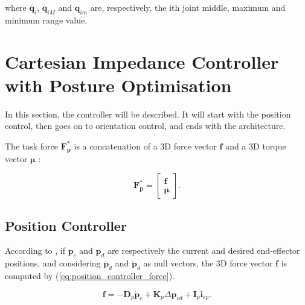 where $\boldsymbol{\bar{q}}_i$, $\boldsymbol{q}_{iM}$ and $\boldsymbol{q}_{im}$ are, respectively, the ith joint middle, maximum and minimum range value.


\section{Cartesian Impedance Controller with Posture Optimisation}
\label{sec:control_architectures_cartesian_impedance_posture_optimisation}

In this section, the controller will be described. It will start with the position control, then goes on to orientation control, and ends with the architecture.

The task force $\boldsymbol{F^*_p}$ is a concatenation of a 3D force vector $\boldsymbol{f}$ and a 3D torque vector $\boldsymbol{\mu}$ \cite{Ochoa2019_control_architecture_robotic_polishing}:

\begin{equation}
    \label{eq:task_force_matrix_notation}
    \boldsymbol{F^*_p} = \begin{bmatrix}
    \boldsymbol{f}\\
    \boldsymbol{\mu}
    \end{bmatrix}.
\end{equation}

\subsection{Position Controller}
\label{subsec:control_architectures_cartesian_impedance_posture_optimisation_position_controller}

According to \citeauthor{Ochoa2019_control_architecture_robotic_polishing} \cite{Ochoa2019_control_architecture_robotic_polishing}, if $\boldsymbol{p}_c$ and $\boldsymbol{p}_d$ are respectively the current and desired end-effector positions, and considering $\ddot{\boldsymbol{p}}_d$ and $\dot{\boldsymbol{p}}_d$ as null vectors, the 3D force vector $\boldsymbol{f}$ is computed by (\ref{eq:position_controller_force}).

\begin{equation}
    \label{eq:position_controller_force}
    \boldsymbol{f} = -\boldsymbol{D}_p \dot{\boldsymbol{p}}_c + \boldsymbol{K}_p \Delta \boldsymbol{p}_{cd} + \boldsymbol{I}_p \boldsymbol{i}_{ep}.
\end{equation}

